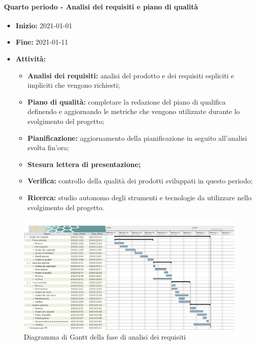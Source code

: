 \paragraph[Quarto periodo]{Quarto periodo - \textnormal{Analisi dei requisiti e piano di qualità}}
\begin{itemize}
    \item [] \textbf{Inizio:} 2021-01-01
    \item [] \textbf{Fine:} 2021-01-11
    \item [] \textbf{Attività:}
          \begin{itemize}
              \item \textbf{Analisi dei requisiti:} analisi del prodotto e dei requisiti espliciti e impliciti che vengono richiesti;
              \item \textbf{Piano di qualità:} completare la redazione del piano di qualifica definendo e aggiornando le metriche che vengono utilizzate durante lo svolgimento del progetto;
              \item \textbf{Pianificazione:} aggiornamento della pianificazione in seguito all'analisi svolta fin'ora;
              \item \textbf{Stesura lettera di presentazione;}
              \item \textbf{Verifica:} controllo della qualità dei prodotti sviluppati in questo periodo;
              \item \textbf{Ricerca:} studio autonomo degli strumenti e tecnologie da utilizzare nello svolgimento del progetto.
          \end{itemize}
\end{itemize}
\begin{figure}[H]
    \centering
    \includegraphics[width=1\linewidth]{res/images/pianificazione/analisi_dei_requisiti.png}
    \caption{Diagramma di Gantt della fase di analisi dei requisiti}
    \label{fig:_Gantt analisi dei requisiti}
\end{figure}

